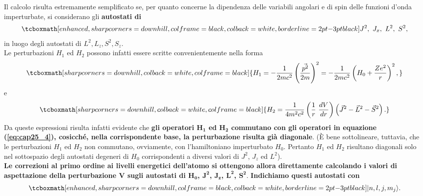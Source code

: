 \documentclass[a4paper,12pt,oneside]{book}
\begin{document}
Il calcolo risulta estremamente semplificato se, per quanto concerne la dipendenza delle variabili angolari e di spin delle funzioni d'onda imperturbate, si considerano gli \textbf{autostati di}
	\begin{equation}
	\label{eq:cap25_4}
		\tcboxmath[enhanced, sharp corners=downhill, colframe=black, colback=white, borderline={2pt}{-3pt}{black}]{
			J^2, \ J_x, \ L^2, \ S^2 ,
			}
	\end{equation}
in luogo degli autostati di $L^2, L_z, S^2, S_z$. \\

Le perturbazioni $H_1$ ed $H_2$ possono infatti essere scritte convenientemente nella forma
	\begin{equation}
	\label{eq:cap25_5}
		\tcboxmath[sharp corners=downhill, colback=white, colframe=black]{
			H_1=-\frac{1}{2mc^2} \left( \frac{\vec{p^2}}{2m} \right)^2 = -\frac{1}{2mc^2} \left( H_0+\frac{Ze^2}{r} \right)^2 ,
			}
	\end{equation}
e
	\begin{equation}
	\label{eq:cap25_6}
		\tcboxmath[sharp corners=downhill, colback=white, colframe=black]{
			H_2=\frac{1}{4m^2c^2} \left( \frac{1}{r} \ \frac{dV}{dr} \right) \left(\vec{J}^2-\vec{L}^2-\vec{S}^2 \right) .
			}
	\end{equation}
Da queste espressioni risulta infatti evidente che \textbf{gli operatori $\boldsymbol{H_1}$ ed $\boldsymbol{H_2}$ commutano con gli operatori in equazione (\ref{eq:cap25_4}), cosicché, nella corrispondente base, la perturbazione risulta già diagonale}. (È bene sottolineare, tuttavia, che le perturbazioni $H_1$ ed $H_2$ non commutano, ovviamente, con l'hamiltoniano imperturbato $H_0$. Pertanto $H_1$ ed $H_2$ risultano diagonali solo nel sottospazio degli autostati degeneri di $H_0$ corrispondenti a diversi valori di $J^2$, $J_z$ ed $L^2$). \\

\textbf{Le correzioni al primo ordine ai livelli energetici dell'atomo si ottengono allora direttamente calcolando i valori di aspettazione della perturbazione $\boldsymbol{V}$ sugli autostati di $\boldsymbol{H_0}$, $\boldsymbol{J^2}$, $\boldsymbol{J_z}$, $\boldsymbol{L^2}$, $\boldsymbol{S^2}$}. \textbf{Indichiamo questi autostati con}
	\begin{equation} 
		\tcboxmath[enhanced, sharp corners=downhill, colframe=black, colback=white, borderline={2pt}{-3pt}{black}]{
			| n,l,j,m_j \rangle .
			}
	\end{equation}\\
	
\end{document}
